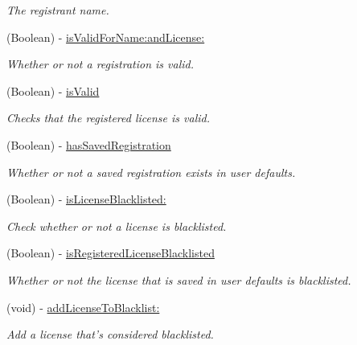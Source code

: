 \begin{DoxyCompactItemize}
\begin{DoxyCompactList}\small\item\em The registrant name. \item\end{DoxyCompactList}\item 
(Boolean) -\/ \hyperlink{interface_g_d_registration_aff2e80860b72d462954323dd0203834f}{isValidForName:andLicense:}
\begin{DoxyCompactList}\small\item\em Whether or not a registration is valid. \item\end{DoxyCompactList}\item 
(Boolean) -\/ \hyperlink{interface_g_d_registration_a172ffae07aff61343bf35bd93d50d9f2}{isValid}
\begin{DoxyCompactList}\small\item\em Checks that the registered license is valid. \item\end{DoxyCompactList}\item 
\hypertarget{interface_g_d_registration_aee73dceb1eb6c134f2a3a6dbfdd682d4}{
(Boolean) -\/ \hyperlink{interface_g_d_registration_aee73dceb1eb6c134f2a3a6dbfdd682d4}{hasSavedRegistration}}
\label{interface_g_d_registration_aee73dceb1eb6c134f2a3a6dbfdd682d4}

\begin{DoxyCompactList}\small\item\em Whether or not a saved registration exists in user defaults. \item\end{DoxyCompactList}\item 
(Boolean) -\/ \hyperlink{interface_g_d_registration_a4b3b036fb9260a31cc1eca5bb436d27e}{isLicenseBlacklisted:}
\begin{DoxyCompactList}\small\item\em Check whether or not a license is blacklisted. \item\end{DoxyCompactList}\item 
\hypertarget{interface_g_d_registration_a1f2a4f7f7d77a633ea6348813a2596ea}{
(Boolean) -\/ \hyperlink{interface_g_d_registration_a1f2a4f7f7d77a633ea6348813a2596ea}{isRegisteredLicenseBlacklisted}}
\label{interface_g_d_registration_a1f2a4f7f7d77a633ea6348813a2596ea}

\begin{DoxyCompactList}\small\item\em Whether or not the license that is saved in user defaults is blacklisted. \item\end{DoxyCompactList}\item 
(void) -\/ \hyperlink{interface_g_d_registration_a7b212d406ecc9f8dc9dc19714baac7f8}{addLicenseToBlacklist:}
\begin{DoxyCompactList}\small\item\em Add a license that's considered blacklisted. \item\end{DoxyCompactList}\end{DoxyCompactItemize}
